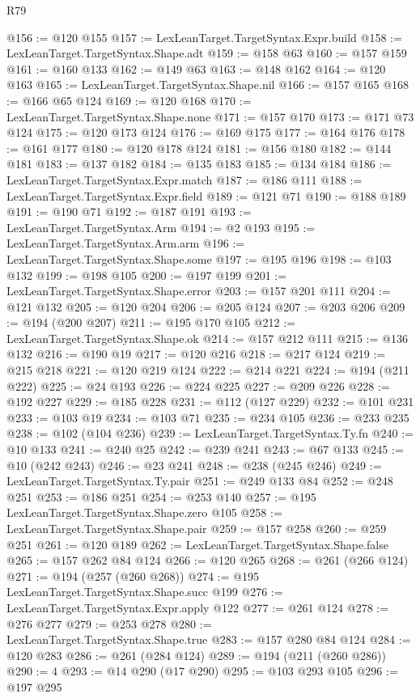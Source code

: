 \begin{lexlean}{R79}
\begin{coremodule}
@156 := @120 @155
@157 := LexLeanTarget.TargetSyntax.Expr.build
@158 := LexLeanTarget.TargetSyntax.Shape.adt
@159 := @158 @63
@160 := @157 @159
@161 := @160 @133
@162 := @149 @63
@163 := @148 @162
@164 := @120 @163
@165 := LexLeanTarget.TargetSyntax.Shape.nil
@166 := @157 @165
@168 := @166 @65 @124
@169 := @120 @168
@170 := LexLeanTarget.TargetSyntax.Shape.none
@171 := @157 @170
@173 := @171 @73 @124
@175 := @120 @173 @124
@176 := @169 @175
@177 := @164 @176
@178 := @161 @177
@180 := @120 @178 @124
@181 := @156 @180
@182 := @144 @181
@183 := @137 @182
@184 := @135 @183
@185 := @134 @184
@186 := LexLeanTarget.TargetSyntax.Expr.match
@187 := @186 @111
@188 := LexLeanTarget.TargetSyntax.Expr.field
@189 := @121 @71
@190 := @188 @189
@191 := @190 @71
@192 := @187 @191
@193 := LexLeanTarget.TargetSyntax.Arm
@194 := @2 @193
@195 := LexLeanTarget.TargetSyntax.Arm.arm
@196 := LexLeanTarget.TargetSyntax.Shape.some
@197 := @195 @196
@198 := @103 @132
@199 := @198 @105
@200 := @197 @199
@201 := LexLeanTarget.TargetSyntax.Shape.error
@203 := @157 @201 @111
@204 := @121 @132
@205 := @120 @204
@206 := @205 @124
@207 := @203 @206
@209 := @194 (@200 @207)
@211 := @195 @170 @105
@212 := LexLeanTarget.TargetSyntax.Shape.ok
@214 := @157 @212 @111
@215 := @136 @132
@216 := @190 @19
@217 := @120 @216
@218 := @217 @124
@219 := @215 @218
@221 := @120 @219 @124
@222 := @214 @221
@224 := @194 (@211 @222)
@225 := @24 @193
@226 := @224 @225
@227 := @209 @226
@228 := @192 @227
@229 := @185 @228
@231 := @112 (@127 @229)
@232 := @101 @231
@233 := @103 @19
@234 := @103 @71
@235 := @234 @105
@236 := @233 @235
@238 := @102 (@104 @236)
@239 := LexLeanTarget.TargetSyntax.Ty.fn
@240 := @10 @133
@241 := @240 @25
@242 := @239 @241
@243 := @67 @133
@245 := @10 (@242 @243)
@246 := @23 @241
@248 := @238 (@245 @246)
@249 := LexLeanTarget.TargetSyntax.Ty.pair
@251 := @249 @133 @84
@252 := @248 @251
@253 := @186 @251
@254 := @253 @140
@257 := @195 LexLeanTarget.TargetSyntax.Shape.zero @105
@258 := LexLeanTarget.TargetSyntax.Shape.pair
@259 := @157 @258
@260 := @259 @251
@261 := @120 @189
@262 := LexLeanTarget.TargetSyntax.Shape.false
@265 := @157 @262 @84 @124
@266 := @120 @265
@268 := @261 (@266 @124)
@271 := @194 (@257 (@260 @268))
@274 := @195 LexLeanTarget.TargetSyntax.Shape.succ @199
@276 := LexLeanTarget.TargetSyntax.Expr.apply @122
@277 := @261 @124
@278 := @276 @277
@279 := @253 @278
@280 := LexLeanTarget.TargetSyntax.Shape.true
@283 := @157 @280 @84 @124
@284 := @120 @283
@286 := @261 (@284 @124)
@289 := @194 (@211 (@260 @286))
@290 := 4
@293 := @14 @290 (@17 @290)
@295 := @103 @293 @105
@296 := @197 @295

\end{coremodule}
\end{lexlean}
